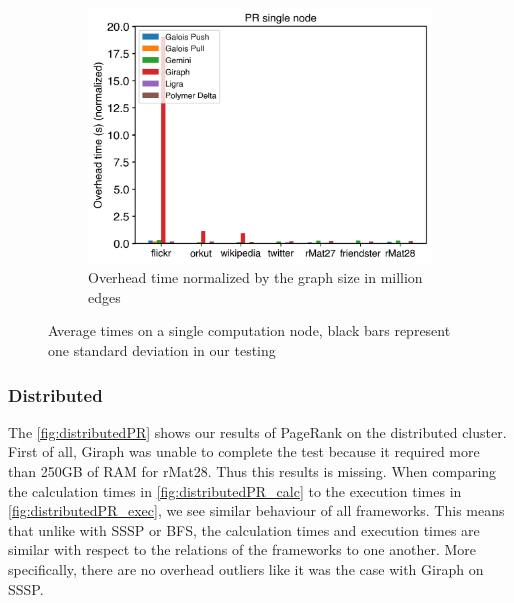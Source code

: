 \begin{figure}
\begin{subfigure}{0.3\textwidth}
		\includegraphics[width=\linewidth]{../../plots/singleNodePR_overheadTimeNormalized.png}
		\caption{Overhead time normalized by the graph size in million edges}
		\label{fig:singleNodePR_overheadNormalized}
	\end{subfigure}
	
	\caption{Average times on a single computation node, black bars represent one standard deviation in our testing}
\end{figure}



\subsubsection{Distributed}
The \autoref{fig:distributedPR} shows our results of PageRank on the distributed cluster.
First of all, Giraph was unable to complete the test because it required more than 250GB of RAM for rMat28. Thus this results is missing.
When comparing the calculation times in \autoref{fig:distributedPR_calc} to the execution times in \autoref{fig:distributedPR_exec}, we see similar behaviour of all frameworks. This means that unlike with SSSP or BFS, the calculation times and execution times are similar with respect to the relations of the frameworks to one another. More specifically, there are no overhead outliers like it was the case with Giraph on SSSP.

